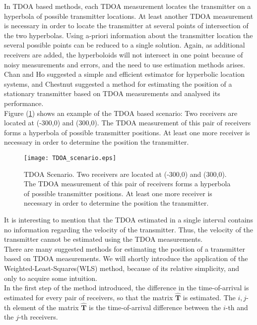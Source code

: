 In TDOA based methods, each TDOA measurement locates the transmitter on a hyperbola of possible transmitter locations. At least another TDOA measurement is necessary in order to locate the transmitter at several points of intersection of the two hyperbolas. Using a-priori information about the transmitter location the several possible points can be reduced to a single solution.
Again, as additional receivers are added, the hyperboloids will not intersect in one point because of noisy measurements and errors, and the need to use estimation methods arises.
Chan and Ho \cite{chan_and_ho} suggested a simple and efficient estimator for hyperbolic location systems, and Chestnut \cite{chestnut} suggested a method for estimating the position of a stationary transmitter based on TDOA measurements and analysed its performance.\\

Figure (\ref{fig:TDOA_scenario}) shows an example of the TDOA based scenario: Two receivers are located at (-300,0) and (300,0). The TDOA measurement of this pair of receivers forms a hyperbola of possible transmitter positions. At least one more receiver is necessary in order to determine the position the transmitter.

\begin{figure}
\begin{center}
\texttt{[image: TDOA\_scenario.eps]}
\end{center}
\caption{TDOA Scenario. Two receivers are located at (-300,0) and (300,0). The TDOA measurement of this pair of receivers forms a hyperbola of possible transmitter positions. At least one more receiver is necessary in order to determine the position the transmitter.}
\label{fig:TDOA_scenario}
\end{figure}

It is interesting to mention that the TDOA estimated in a single interval contains no information regarding the velocity of the transmitter. Thus, the velocity of the transmitter cannot be estimated using the TDOA measurements.\\

There are many suggested methods for estimating the position of a transmitter based on TDOA measurements. We will shortly introduce the application of the Weighted-Least-Squares(WLS) method, because of its relative simplicity, and only to acquire some intuition.\\

In the first step of the method introduced, the difference in the time-of-arrival is estimated for every pair of receivers, so that the matrix $\mathbf{\hat{T}}$ is estimated. The $i,j$-th element of the matrix $\mathbf{\hat{T}}$ is the time-of-arrival difference between the $i$-th and the $j$-th receivers.\\


